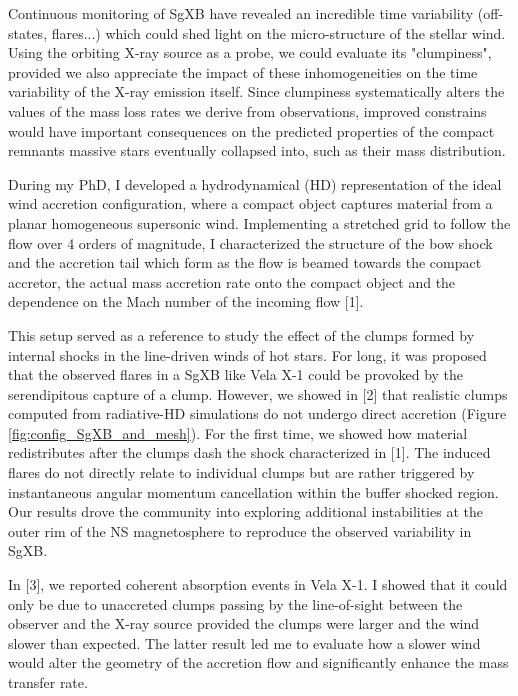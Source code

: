 \documentclass[letterpaper,12pt,onecolumn]{article}
\makeatletter
\newcommand{\sgx}{SgXB\xspace}
\newcommand*{\ns}{NS\@\xspace}
\makeatother
\begin{document}
Continuous monitoring of \sgx have revealed an incredible time variability (off-states, flares...) which could shed light on the micro-structure of the stellar wind. Using the orbiting X-ray source as a probe, we could evaluate its "clumpiness", provided we also appreciate the impact of these inhomogeneities on the time variability of the X-ray emission itself. Since clumpiness systematically alters the values of the mass loss rates we derive from observations, improved constrains would have important consequences on the predicted properties of the compact remnants massive stars eventually collapsed into, such as their mass distribution.

During my PhD, I developed a hydrodynamical (HD) representation of the ideal wind accretion configuration, where a compact object captures material from a planar homogeneous supersonic wind. Implementing a stretched grid to follow the flow over 4 orders of magnitude, I characterized the structure of the bow shock and the accretion tail which form as the flow is beamed towards the compact accretor, the actual mass accretion rate onto the compact object and the dependence on the Mach number of the incoming flow [1]. 

This setup served as a reference to study the effect of the clumps formed by internal shocks in the line-driven winds of hot stars. For long, it was proposed that the observed flares in a \sgx like Vela X-1 could be provoked by the serendipitous capture of a clump. However, we showed in [2] that realistic clumps computed from radiative-HD simulations do not undergo direct accretion (Figure\,\,\ref{fig:config_SgXB_and_mesh}). For the first time, we showed how material redistributes after the clumps dash the shock characterized in [1]. The induced flares do not directly relate to individual clumps but are rather triggered by instantaneous angular momentum cancellation within the buffer shocked region. Our results drove the community into exploring additional instabilities at the outer rim of the \ns magnetosphere to reproduce the observed variability in \sgx.

In [3], we reported coherent absorption events in Vela X-1. I showed that it could only be due to unaccreted clumps passing by the line-of-sight between the observer and the X-ray source provided the clumps were larger and the wind slower than expected. The latter result led me to evaluate how a slower wind would alter the geometry of the accretion flow and significantly enhance the mass transfer rate.
\end{document}
